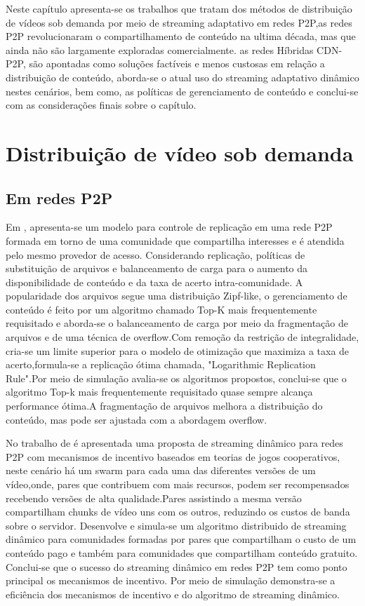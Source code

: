 \documentclass[
	12pt,
	oneside,
	a4paper,
	english,
	brazil
	]{abntex2ppgsi}
\begin{document}
Neste capítulo apresenta-se os trabalhos que tratam dos métodos de distribuição de vídeos sob demanda por meio de streaming adaptativo em redes P2P,as redes P2P revolucionaram o compartilhamento de conteúdo na ultima década, mas que ainda não são largamente exploradas comercialmente. as redes Híbridas CDN-P2P, são apontadas como soluções factíveis e menos custosas em relação a distribuição de conteúdo, aborda-se o atual uso do streaming adaptativo dinâmico nestes cenários, bem como, as políticas de gerenciamento de conteúdo e conclui-se com as considerações finais sobre o capítulo.

\section{Distribuição de vídeo sob demanda}
\subsection{Em redes P2P}

Em \cite{Kangasharju2007}, apresenta-se um modelo para controle de replicação em uma rede P2P formada em torno de uma comunidade que compartilha interesses e é atendida pelo mesmo provedor de acesso. Considerando replicação, políticas de substituição de arquivos e balanceamento de carga para o aumento da disponibilidade de conteúdo e da taxa de acerto intra-comunidade. A popularidade dos arquivos segue uma distribuição Zipf-like, o gerenciamento de conteúdo é feito por um algoritmo chamado Top-K mais frequentemente requisitado e aborda-se o balanceamento de carga por meio da fragmentação de arquivos e de uma técnica de overflow.Com remoção da restrição de integralidade, cria-se um limite superior para o modelo de otimização que maximiza a taxa de acerto,formula-se a replicação ótima chamada, "Logarithmic Replication Rule".Por meio de simulação avalia-se os algoritmos propostos, conclui-se que o algoritmo Top-k mais frequentemente requisitado quase sempre alcança performance ótima.A fragmentação de arquivos melhora a distribuição do conteúdo, mas pode ser ajustada com a abordagem overflow.


No trabalho de \cite{Tian2013} é apresentada uma proposta de streaming dinâmico para redes P2P com mecanismos de incentivo baseados em teorias de jogos cooperativos, neste cenário há um swarm para cada uma das diferentes versões de um vídeo,onde, pares que contribuem com mais recursos, podem ser recompensados recebendo versões de alta qualidade.Pares assistindo a mesma versão compartilham chunks de vídeo uns com os outros, reduzindo os custos de banda sobre o servidor. Desenvolve e simula-se um algoritmo distribuido de streaming dinâmico para comunidades formadas por pares que compartilham o custo de um conteúdo pago e também para comunidades que compartilham conteúdo gratuito. Conclui-se que o sucesso do streaming dinâmico em redes P2P tem como ponto principal os mecanismos de incentivo. Por meio de simulação demonstra-se a eficiência dos mecanismos de incentivo e do algoritmo de streaming dinâmico.
\end{document}
